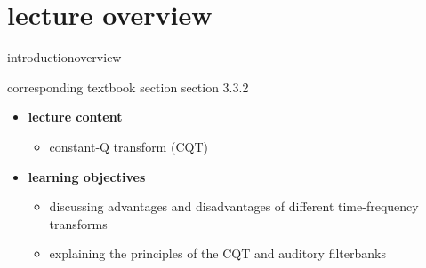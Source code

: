 


\subtitle{Module 3.3.2: Time-Frequency Representations~---~Constant Q Transform}


	

    \section[overview]{lecture overview}
        \begin{frame}{introduction}{overview}
            \begin{block}{corresponding textbook section}
                    section 3.3.2
            \end{block}

            \begin{itemize}
                \item   \textbf{lecture content}
                    \begin{itemize}
                        \item   constant-Q transform (CQT)
                    \end{itemize}
                \bigskip
                \item<2->   \textbf{learning objectives}
                    \begin{itemize}
                        \item   discussing advantages and disadvantages of different time-frequency transforms
                        \item   explaining the principles of the CQT and auditory filterbanks
                    \end{itemize}
            \end{itemize}
        \end{frame}
        
